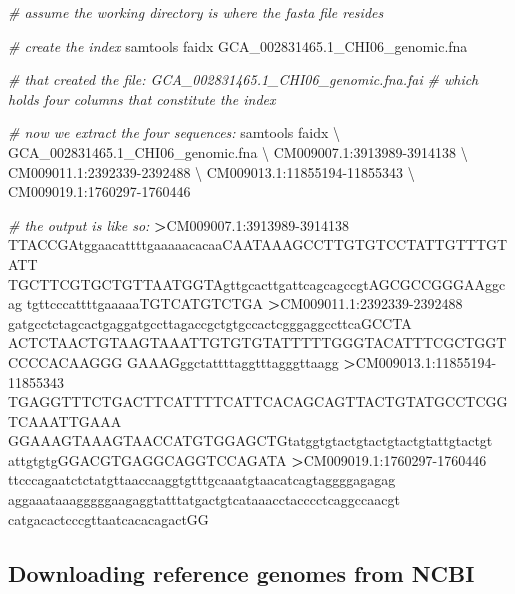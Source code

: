 \documentclass[]{krantz}
\makeatletter
\newenvironment{Shaded}{\begin{snugshade}}{\end{snugshade}}
\newcommand{\CommentTok}[1]{\textcolor[rgb]{0.37,0.37,0.37}{\textit{#1}}}
\newcommand{\ExtensionTok}[1]{#1}
\newcommand{\NormalTok}[1]{#1}
\newcommand{\OperatorTok}[1]{\textcolor[rgb]{0.43,0.43,0.43}{\textbf{#1}}}
\newenvironment{kframe}{%
\medskip{}
\setlength{\fboxsep}{.8em}
 \def\at@end@of@kframe{}%
 \ifinner\ifhmode%
  \def\at@end@of@kframe{\end{minipage}}%
  \begin{minipage}{\columnwidth}%
 \fi\fi%
 \def\FrameCommand##1{\hskip\@totalleftmargin \hskip-\fboxsep
 \colorbox{shadecolor}{##1}\hskip-\fboxsep
     \hskip-\linewidth \hskip-\@totalleftmargin \hskip\columnwidth}%
 \MakeFramed {\advance\hsize-\width
   \@totalleftmargin\z@ \linewidth\hsize
   \@setminipage}}%
 {\par\unskip\endMakeFramed%
 \at@end@of@kframe}
\renewenvironment{Shaded}{\begin{kframe}}{\end{kframe}}
\makeatother
\begin{document}
\begin{Shaded}
\begin{Highlighting}[]
\CommentTok{# assume the working directory is where the fasta file resides}

\CommentTok{# create the index}
\ExtensionTok{samtools}\NormalTok{ faidx GCA_002831465.1_CHI06_genomic.fna}

\CommentTok{# that created the file: GCA_002831465.1_CHI06_genomic.fna.fai}
\CommentTok{# which holds four columns that constitute the index}

\CommentTok{# now we extract the four sequences:}
\ExtensionTok{samtools}\NormalTok{ faidx \textbackslash{}}
\NormalTok{    GCA_002831465.1_CHI06_genomic.fna \textbackslash{}}
\NormalTok{    CM009007.1:3913989-3914138 \textbackslash{}}
\NormalTok{    CM009011.1:2392339-2392488 \textbackslash{}}
\NormalTok{    CM009013.1:11855194-11855343 \textbackslash{}}
\NormalTok{    CM009019.1:1760297-1760446}
    
\CommentTok{# the output is like so:}
\OperatorTok{>}\ExtensionTok{CM009007.1}\NormalTok{:3913989-3914138}
\ExtensionTok{TTACCGAtggaacattttgaaaaacacaaCAATAAAGCCTTGTGTCCTATTGTTTGTATT}
\ExtensionTok{TGCTTCGTGCTGTTAATGGTAgttgcacttgattcagcagccgtAGCGCCGGGAAggcag}
\ExtensionTok{tgttcccattttgaaaaaTGTCATGTCTGA}
\OperatorTok{>}\ExtensionTok{CM009011.1}\NormalTok{:2392339-2392488}
\ExtensionTok{gatgcctctagcactgaggatgccttagaccgctgtgccactcgggaggccttcaGCCTA}
\ExtensionTok{ACTCTAACTGTAAGTAAATTGTGTGTATTTTTGGGTACATTTCGCTGGTCCCCACAAGGG}
\ExtensionTok{GAAAGggctattttaggtttagggttaagg}
\OperatorTok{>}\ExtensionTok{CM009013.1}\NormalTok{:11855194-11855343}
\ExtensionTok{TGAGGTTTCTGACTTCATTTTCATTCACAGCAGTTACTGTATGCCTCGGTCAAATTGAAA}
\ExtensionTok{GGAAAGTAAAGTAACCATGTGGAGCTGtatggtgtactgtactgtactgtattgtactgt}
\ExtensionTok{attgtgtgGGACGTGAGGCAGGTCCAGATA}
\OperatorTok{>}\ExtensionTok{CM009019.1}\NormalTok{:1760297-1760446}
\ExtensionTok{ttcccagaatctctatgttaaccaaggtgtttgcaaatgtaacatcagtaggggagagag}
\ExtensionTok{aggaaataaagggggaagaggtatttatgactgtcataaacctacccctcaggccaacgt}
\ExtensionTok{catgacactcccgttaatcacacagactGG}
\end{Highlighting}
\end{Shaded}

\hypertarget{downloading-reference-genomes-from-ncbi}{%
\subsection{Downloading reference genomes from NCBI}\label{downloading-reference-genomes-from-ncbi}}
\end{document}
